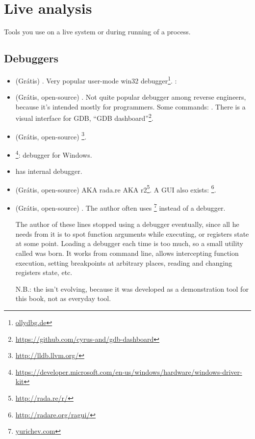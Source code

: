 \section{Live analysis}

Tools you use on a live system or during running of a process.

\subsection{Debuggers}

\myindex{\olly}

\begin{itemize}
\item (Grátis) .
Very popular user-mode win32 debugger\footnote{\href{http://go.yurichev.com/17032}{ollydbg.de}}.
\ShortHotKeyCheatsheet: 

\item (Grátis, open-source) .
Not quite popular debugger among reverse engineers, because it's intended mostly for programmers.
Some commands: .
There is a visual interface for GDB, ``GDB dashboard''\footnote{\url{https://github.com/cyrus-and/gdb-dashboard}}.

\item (Grátis, open-source) \footnote{\url{http://lldb.llvm.org/}}.

\item {}\footnote{\url{https://developer.microsoft.com/en-us/windows/hardware/windows-driver-kit}}:
debugger for Windows.

\item {} has internal debugger.

\item (Grátis, open-source)  \ac{AKA} rada.re \ac{AKA} r2\footnote{\url{http://rada.re/r/}}.
A GUI also exists: \footnote{\url{http://radare.org/ragui/}}.

\item (Grátis, open-source) .
\label{tracer}
The author often uses 
\footnote{\href{http://go.yurichev.com/17338}{yurichev.com}}
instead of a debugger.

The author of these lines stopped using a debugger eventually, since all he needs from it is to spot function arguments while
executing, or registers state at some point.
Loading a debugger each time is too much, so a small utility called  was born.
It works from command line, allows intercepting function execution,
setting breakpoints at arbitrary places, reading and changing registers state, etc.

N.B.: the  isn't evolving, because it was developed as a demonstration tool for this book, not as everyday tool.
\end{itemize}

